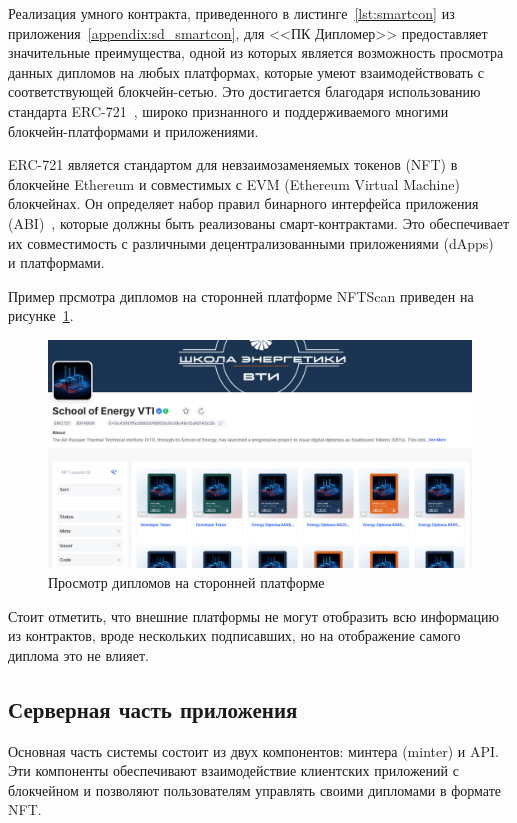 Реализация умного контракта, приведенного в листинге~\ref{lst:smartcon} из приложения~\ref{appendix:sd_smartcon}, для <<ПК Дипломер>> предоставляет значительные преимущества, одной из которых является возможность просмотра данных дипломов на любых платформах, которые умеют взаимодействовать с соответствующей блокчейн-сетью. Это достигается благодаря использованию стандарта ERC-721~\cite{bib:erc721}, широко признанного и поддерживаемого многими блокчейн-платформами и приложениями.

ERC-721 является стандартом для невзаимозаменяемых токенов (NFT) в блокчейне Ethereum и совместимых с EVM (Ethereum Virtual Machine) блокчейнах. Он определяет набор правил бинарного интерфейса приложения (ABI)~\cite{bib:abi_is}, которые должны быть реализованы смарт-контрактами. Это обеспечивает их совместимость с различными децентрализованными приложениями (dApps)~\cite{bib:dapps} и платформами.

Пример прсмотра дипломов на сторонней платформе NFTScan приведен на рисунке~\ref{fig:s3_nftscan}.

\begin{figure}[H]
	\centering
	\includegraphics[width=1\textwidth]{images/s3_nftscan.png}
	\parskip=6pt
	\caption{Просмотр дипломов на сторонней платформе}
	\label{fig:s3_nftscan}
\end{figure}

Стоит отметить, что внешние платформы не могут отобразить всю информацию из контрактов, вроде нескольких подписавших, но на отображение самого диплома это не влияет.

\subsection{Серверная часть приложения}

Основная часть системы состоит из двух компонентов: минтера (minter) и API. Эти компоненты обеспечивают взаимодействие клиентских приложений с блокчейном и позволяют пользователям управлять своими дипломами в формате NFT.

